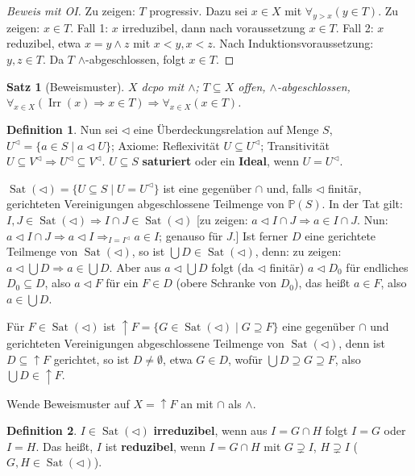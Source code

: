 \documentclass[headsepline=true,DIV=11]{scrartcl}
\newtheorem*{theorem}{Satz}
\theoremstyle{definition}
\newtheorem*{definition}{Definition}
\newcommand{\Irr}{\operatorname{Irr}}
\newcommand{\Sat}{\operatorname{Sat}}
\begin{document}
\begin{proof}[Beweis mit OI]
  Zu zeigen: $T$ progressiv. Dazu sei $x\in X$ mit $\forall_{y>x}(y\in T)$. Zu zeigen: $x\in T$. Fall 1: $x$ irreduzibel, dann nach voraussetzung
  $x\in T$. Fall 2: $x$ reduzibel, etwa $x=y\wedge z$ mit $x<y,x<z$. Nach Induktionsvoraussetzung: $y,z\in T$. Da $T$ $\wedge$-abgeschlossen, folgt
  $x\in T$.
\end{proof}

\begin{theorem}[Beweismuster]
  $X$ dcpo mit $\wedge$; $T\subseteq X$ offen, $\wedge$-abgeschlossen, $\forall_{x\in X}(\Irr(x)\Rightarrow x\in T)\Rightarrow\forall_{x\in X}(x\in
  T)$.
\end{theorem}

\begin{definition}
Nun sei $\lhd$ eine Überdeckungsrelation auf Menge $S$, $U^\lhd=\{a\in S\mid a \lhd U\}$; Axiome: Reflexivität $U\subseteq U^\lhd$; Transitivität
$U\subseteq V^\lhd\Rightarrow U^\lhd\subseteq V^\lhd$. $U\subseteq S$ {\bf saturiert} oder ein {\bf Ideal}, wenn $U=U^\lhd$.
\end{definition}

$\Sat(\lhd)=\{U\subseteq S\mid U=U^\lhd\}$ ist eine gegenüber $\cap$ und, falls $\lhd$ finitär, gerichteten Vereinigungen abgeschlossene Teilmenge von
$\mathbb{P}(S)$. In der Tat gilt: $I,J\in\Sat(\lhd)\Rightarrow I\cap J\in\Sat(\lhd)$ [zu zeigen: $a\lhd I\cap J\Rightarrow a\in I\cap J$. Nun: $a\lhd
  I\cap J\Rightarrow a\lhd I\Rightarrow_{I=I^\lhd} a\in I$; genauso für $J$.] Ist ferner $D$ eine gerichtete Teilmenge von $\Sat(\lhd)$, so ist
$\bigcup D\in\Sat(\lhd)$, denn: zu zeigen: $a\lhd\bigcup D\Rightarrow a\in\bigcup D$. Aber aus $a\lhd\bigcup D$ folgt (da $\lhd$ finitär) $a\lhd D_0$
für endliches $D_0\subseteq D$, also $a\lhd F$ für ein $F\in D$ (obere Schranke von $D_0$), das heißt $a\in F$, also $a\in\bigcup D$.

Für $F\in\Sat(\lhd)$ ist $\uparrow F=\{G\in\Sat(\lhd)\mid G\supseteq F\}$ eine gegenüber $\cap$ und gerichteten Vereinigungen abgeschlossene Teilmenge
von $\Sat(\lhd)$, denn ist $D\subseteq\uparrow F$ gerichtet, so ist $D\neq\emptyset$, etwa $G\in D$, wofür $\bigcup D\supseteq G\supseteq F$, also
$\bigcup D\in\uparrow F$.

Wende Beweismuster auf $X=\uparrow F$ an mit $\cap$ als $\wedge$.

\begin{definition}
  $I\in\Sat(\lhd)$ {\bf irreduzibel}, wenn aus $I=G\cap H$ folgt $I=G$ oder $I=H$. Das heißt, $I$ ist {\bf reduzibel}, wenn $I=G\cap H$ mit
  $G\supsetneq I$, $H\supsetneq I$ ($G, H\in\Sat(\lhd)$).
\end{definition}
\end{document}
